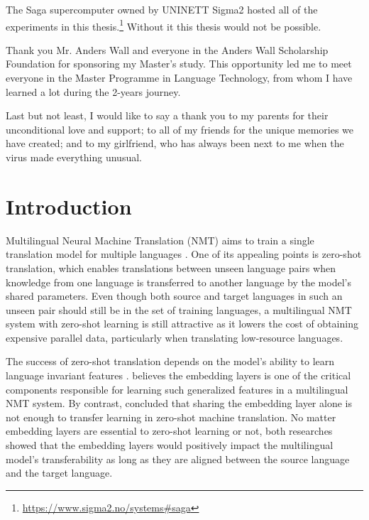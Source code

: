 \documentclass[thesis]{cluu}
\begin{document}
The Saga supercomputer owned by UNINETT Sigma2 hosted all of the experiments in this thesis.\footnote{\url{https://www.sigma2.no/systems\#saga}} Without it this thesis would not be possible.

Thank you Mr. Anders Wall and everyone in the Anders Wall Scholarship Foundation for sponsoring my Master's study. This opportunity led me to meet everyone in the Master Programme in Language Technology, from whom I have learned a lot during the 2-years journey.

Last but not least, I would like to say a thank you to my parents for their unconditional love and support; to all of my friends for the unique memories we have created; and to my girlfriend, who has always been next to me when the virus made everything unusual.


\chapter{Introduction}

Multilingual Neural Machine Translation (NMT) aims to train a single translation model for multiple languages \parencite{Johnson:2016aa,aharoni-etal-2019-massively}. One of its appealing points is zero-shot translation, which enables translations between unseen language pairs when knowledge from one language is transferred to another language by the model's shared parameters. Even though both source and target languages in such an unseen pair should still be in the set of training languages, a multilingual NMT system with zero-shot learning is still attractive as it lowers the cost of obtaining expensive parallel data, particularly when translating low-resource languages.

The success of zero-shot translation depends on the model's ability to learn language invariant features \parencite{Arivazhagan:2019aa}. \textcite{Kim:2019aa} believes the embedding layers is one of the critical components responsible for learning such generalized features in a multilingual NMT system. By contrast, \textcite{aji-etal-2020-neural} concluded that sharing the embedding layer alone is not enough to transfer learning in zero-shot machine translation. No matter embedding layers are essential to zero-shot learning or not, both researches showed that the embedding layers would positively impact the multilingual model's transferability as long as they are aligned between the source language and the target language.
\end{document}
